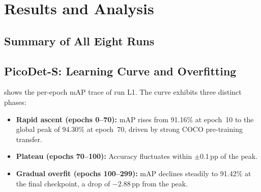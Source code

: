 \section{Results and Analysis}
\label{sec:results}

\subsection{Summary of All Eight Runs}

\begin{table}[H]
\centering
\caption{Complete results for all eight training runs.
  $\uparrow$ = higher is better.}
\label{tab:all_results}
\end{table}

\subsection{PicoDet-S: Learning Curve and Overfitting}
\label{sec:results:picodet_curve}

 shows the per-epoch mAP trace of run L1.
The curve exhibits three distinct phases:

\begin{itemize}[leftmargin=1.5em]
  \item \textbf{Rapid ascent (epochs 0--70):}
    mAP rises from 91.16\% at epoch~10 to the global peak of
    94.30\% at epoch~70, driven by strong COCO pre-training transfer.
  \item \textbf{Plateau (epochs 70--100):}
    Accuracy fluctuates within $\pm$0.1\,pp of the peak.
  \item \textbf{Gradual overfit (epochs 100--299):}
    mAP declines steadily to 91.42\% at the final checkpoint, a
    drop of $-2.88$\,pp from the peak.
\end{itemize}


